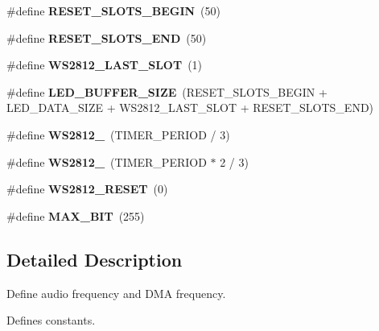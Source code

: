 \begin{DoxyCompactItemize}
\mbox{\label{group___constant_ga38b56d14857b32e86b876a32957a2b63}} 
\#define {\bfseries R\+E\+S\+E\+T\+\_\+\+S\+L\+O\+T\+S\+\_\+\+B\+E\+G\+IN}~(50)
\item 
\mbox{\label{group___constant_ga91e46b7f75ff75a4719a9d7f589df5a3}} 
\#define {\bfseries R\+E\+S\+E\+T\+\_\+\+S\+L\+O\+T\+S\+\_\+\+E\+ND}~(50)
\item 
\mbox{\label{group___constant_gacbccf04b27120fd8ba0a8eae7866291f}} 
\#define {\bfseries W\+S2812\+\_\+\+L\+A\+S\+T\+\_\+\+S\+L\+OT}~(1)
\item 
\mbox{\label{group___constant_ga398165d967d8a2c8ff57ddd0a081a5ff}} 
\#define {\bfseries L\+E\+D\+\_\+\+B\+U\+F\+F\+E\+R\+\_\+\+S\+I\+ZE}~(R\+E\+S\+E\+T\+\_\+\+S\+L\+O\+T\+S\+\_\+\+B\+E\+G\+IN + L\+E\+D\+\_\+\+D\+A\+T\+A\+\_\+\+S\+I\+ZE + W\+S2812\+\_\+\+L\+A\+S\+T\+\_\+\+S\+L\+OT + R\+E\+S\+E\+T\+\_\+\+S\+L\+O\+T\+S\+\_\+\+E\+ND)
\item 
\mbox{\label{group___constant_ga3c67cd1a76ba7e85676da5f023f42430}} 
\#define {\bfseries W\+S2812\+\_}~(T\+I\+M\+E\+R\+\_\+\+P\+E\+R\+I\+OD / 3)
\item 
\mbox{\label{group___constant_gad4cec7bff3f072ffe9ec1e11324c7418}} 
\#define {\bfseries W\+S2812\+\_}~(T\+I\+M\+E\+R\+\_\+\+P\+E\+R\+I\+OD $\ast$ 2 / 3)
\item 
\mbox{\label{group___constant_gaef8a90792d52a7085de6c0affec15557}} 
\#define {\bfseries W\+S2812\+\_\+\+R\+E\+S\+ET}~(0)
\item 
\mbox{\label{group___constant_gaaf645a2813f2274619a70855afb92aca}} 
\#define {\bfseries M\+A\+X\+\_\+B\+IT}~(255)
\end{DoxyCompactItemize}


\subsection{Detailed Description}
Define audio frequency and D\+MA frequency. 

Defines constants.